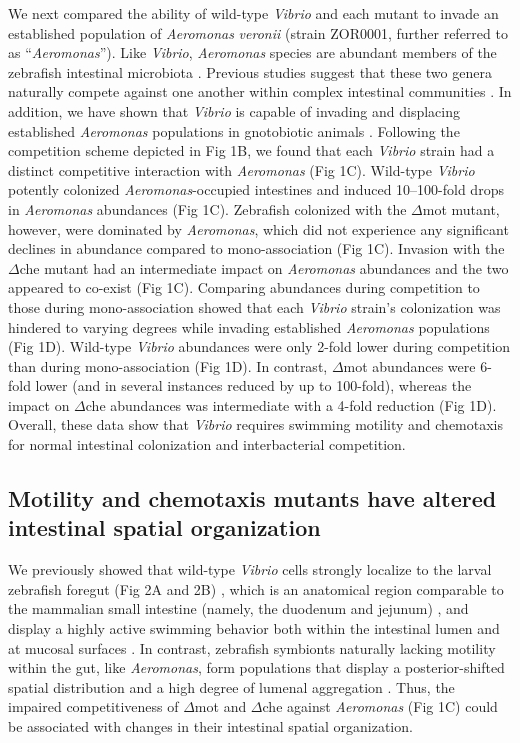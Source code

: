 We next compared the ability of wild-type \textit{Vibrio} and each mutant to invade an established population of \textit{Aeromonas} \textit{veronii} (strain ZOR0001, further referred to as ``\textit{Aeromonas}''). Like \textit{Vibrio}, \textit{Aeromonas} species are abundant members of the zebrafish intestinal microbiota \cite{stephens_composition_2016}. Previous studies suggest that these two genera naturally compete against one another within complex intestinal communities \cite{phelps_microbial_2017}. In addition, we have shown that \textit{Vibrio} is capable of invading and displacing established \textit{Aeromonas} populations in gnotobiotic animals \cite{wiles_host_2016}. Following the competition scheme depicted in Fig 1B, we found that each \textit{Vibrio} strain had a distinct competitive interaction with \textit{Aeromonas} (Fig 1C). Wild-type \textit{Vibrio} potently colonized \textit{Aeromonas}-occupied intestines and induced 10–100-fold drops in \textit{Aeromonas} abundances (Fig 1C). Zebrafish colonized with the $\Delta$mot mutant, however, were dominated by \textit{Aeromonas}, which did not experience any significant declines in abundance compared to mono-association (Fig 1C). Invasion with the $\Delta$che mutant had an intermediate impact on \textit{Aeromonas} abundances and the two appeared to co-exist (Fig 1C). Comparing abundances during competition to those during mono-association showed that each \textit{Vibrio} strain's colonization was hindered to varying degrees while invading established \textit{Aeromonas} populations (Fig 1D). Wild-type \textit{Vibrio} abundances were only 2-fold lower during competition than during mono-association (Fig 1D). In contrast, $\Delta$mot abundances were 6-fold lower (and in several instances reduced by up to 100-fold), whereas the impact on $\Delta$che abundances was intermediate with a 4-fold reduction (Fig 1D). Overall, these data show that \textit{Vibrio} requires swimming motility and chemotaxis for normal intestinal colonization and interbacterial competition.


\subsection{Motility and chemotaxis mutants have altered intestinal spatial organization}
We previously showed that wild-type \textit{Vibrio} cells strongly localize to the larval zebrafish foregut (Fig 2A and 2B) \cite{schlomann_bacterial_2018}, which is an anatomical region comparable to the mammalian small intestine (namely, the duodenum and jejunum) \cite{lickwar_genomic_2017,wang_morphological_2010}, and display a highly active swimming behavior both within the intestinal lumen and at mucosal surfaces \cite{wiles_host_2016}. In contrast, zebrafish symbionts naturally lacking motility within the gut, like \textit{Aeromonas}, form populations that display a posterior-shifted spatial distribution and a high degree of lumenal aggregation \cite{schlomann_bacterial_2018,wiles_host_2016}. Thus, the impaired competitiveness of $\Delta$mot and $\Delta$che against \textit{Aeromonas} (Fig 1C) could be associated with changes in their intestinal spatial organization. 

